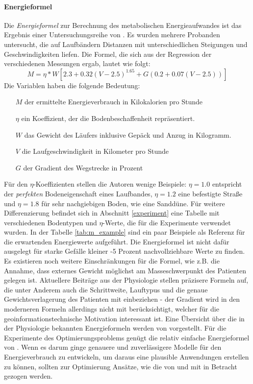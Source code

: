 \documentclass[12pt]{article}
\begin{document}
\paragraph{Energieformel} Die \textit{Energieformel} zur Berechnung des metabolischen Energieaufwandes ist das Ergebnis einer Untersuchungsreihe von \cite{givoni1971}. Es wurden mehrere Probanden untersucht, die auf Laufbändern Distanzen mit unterschiedlichen Steigungen und Geschwindigkeiten liefen. Die Formel, die sich aus der Regression der verschiedenen Messungen ergab, lautet wie folgt:
\begin{equation}
	M = \eta * W \left[ 2.3 + 0.32 \left( V - 2.5 \right)^{1.65} + G \left( 0.2 + 0.07 \left( V - 2.5 \right) \right) \right] 
\end{equation}
Die Variablen haben die folgende Bedeutung:
\begin{itemize}
\item[$M$] der ermittelte Energieverbrauch in Kilokalorien pro Stunde
\item[$\eta$] ein Koeffizient, der die Bodenbeschaffenheit repräsentiert.
\item[$W$] das Gewicht des Läufers inklusive Gepäck und Anzug in Kilogramm.
\item[$V$] die Laufgeschwindigkeit in Kilometer pro Stunde 
\item[$G$] der Gradient des Wegstrecke in Prozent
\end{itemize}
Für den $\eta$-Koeffizienten stellen die Autoren wenige Beispiele: $\eta = 1.0$ entspricht der \textit{perfekten} Bodeneigenschaft eines Laufbandes, $\eta = 1.2$ eine befestigte Straße und $\eta = 1.8$ für sehr nachgiebigen Boden, wie eine Sanddüne. Für weitere Differenzierung befindet sich in Abschnitt \ref{experiment} eine Tabelle mit verschiedenen Bodentypen und $\eta$-Werte, die für die Experimente verwendet wurden. In der Tabelle \ref{tab:m_example} sind ein paar Beispiele als Referenz für die erwartenden Energiewerte aufgeführt. Die Energieformel ist nicht dafür ausgelegt für starke Gefälle kleiner -5 Prozent nachvollziehbare Werte zu finden. Es existieren noch weitere Einschränkungen für die Formel, wie z.B. die Annahme, dass externes Gewicht möglichst am Masseschwerpunkt des Patienten gelegen ist. Aktuellere Beiträge aus der Physiologie stellen präzisere Formeln auf, die unter Anderem auch die Schrittweite, Lauftypus und die genaue Gewichtsverlagerung des Patienten mit einbeziehen - der Gradient wird in den moderneren Formeln allerdings nicht mit berücksichtigt, welcher für die geoinformationstechnische Motivation interessant ist. Eine Übersicht über die in der Physiologie bekannten Energieformeln werden von \cite{hall2004} vorgestellt. Für die Experimente des Optimierungsproblems genügt die relativ einfache Energieformel von \cite{givoni1971}. Wenn es darum ginge genauere und zuverlässigere Modelle für den Energieverbrauch zu entwickeln, um daraus eine plausible Anwendungen erstellen zu können, sollten zur Optimierung Ansätze, wie die von \cite{pandolf1976} und \cite{sun2013} mit in Betracht gezogen werden. 
\end{document}

